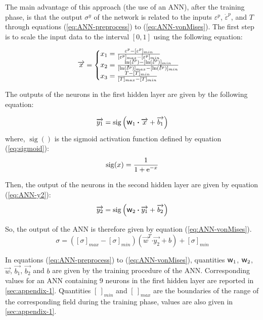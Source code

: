 \documentclass[preprint,12pt,times]{elsarticle}
\newcommand{\e}[1]{\mbox{\ensuremath{\mathrm{e}^{#1}}}}
\DeclareMathOperator{\sigmoid}{sig}
\newcommand{\dotp}{\boldsymbol{\cdot}}
\newcommand{\w}{\mbox{\large\ensuremath{\mathsf{w}}}}
\newcommand{\mdot}[1]{\accentset{\mbox{\bfseries .}}{#1}}
\begin{document}
The main advantage of this approach (the use of an ANN), after the training phase, is that the output $\sigma^y$ of the network is related to the inputs $\varepsilon^p$, ${\dot{\varepsilon}}^p$, and $T$ through equations (\ref{eq:ANN-preprocess}) to (\ref{eq:ANN-vonMises}). The first step is to scale the input data to the interval $[0,1]$ using the following equation:

\begin{equation}
\overrightarrow{x} =
\begin{cases}
x_1 = \frac{\varepsilon^p - [\varepsilon^p]_{min}}{[\varepsilon^p]_{max} - [\varepsilon^p]_{min}}\\
x_2 = \frac{\ln(\mdot{\varepsilon}^p)-[\ln(\mdot{\varepsilon}^p)]_{min}}{[\ln(\mdot{\varepsilon}^p)]_{max}-[\ln(\mdot{\varepsilon}^p)]_{min}}\label{eq:ANN-preprocess}\\
x_3 = \frac{T-[T]_{min}}{[T]_{max}-[T]_{min}}
\end{cases}
\end{equation}

The outputs of the neurons in the first hidden layer are given by the following equation:

\begin{equation}
\overrightarrow{y_1} = \sigmoid\left(\w_1 \dotp \overrightarrow{x}+ \overrightarrow{b_1}\right)\label{eq:ANN-y1}
\end{equation}
where, $\sigmoid()$ is the sigmoid activation function defined by equation (\ref{eq:sigmoid}):
\begin{equation}
\sigmoid(x)=\frac{1}{1 + \e{-x}}\label{eq:sigmoid}
\end{equation}

Then, the output of the neurons in the second hidden layer are given by equation (\ref{eq:ANN-y2}):
\begin{equation}
\overrightarrow{y_2} = \sigmoid\left(\w_2 \dotp \overrightarrow{y_1}+ \overrightarrow{b_2}\right)\label{eq:ANN-y2}
\end{equation}

So, the output of the ANN is therefore given by equation (\ref{eq:ANN-vonMises}).
\begin{equation}
\sigma =  \left([\sigma]_{max}-[\sigma]_{min}\right) \left(\overrightarrow{w}^T \dotp \overrightarrow{y_2} + b\right) + [\sigma]_{min} \label{eq:ANN-vonMises}
\end{equation}

In equations (\ref{eq:ANN-preprocess}) to (\ref{eq:ANN-vonMises}), quantities $\w_1$, $\w_2$, $\overrightarrow{w}$, $\overrightarrow{b_1}$, $\overrightarrow{b_2}$ and $b$ are given by the training procedure of the ANN. Corresponding values for an ANN containing 9 neurons in the first hidden layer are reported in \ref{sec:appendix-1}. Quantities $[\ ]_{min}$ and $[\ ]_{max}$  are the boundaries of the range of the corresponding field during the training phase, values are also given in \ref{sec:appendix-1}.
\end{document}
